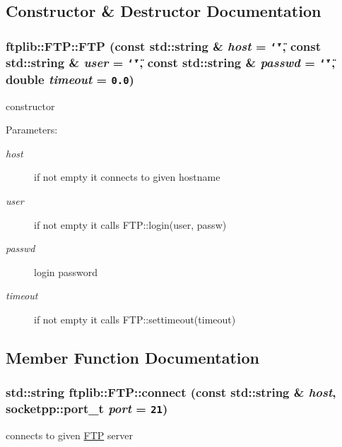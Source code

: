 \subsection{Constructor \& Destructor Documentation}
\hypertarget{classftplib_1_1FTP_178979abdc58593abdb31a882f370803}{
\subsubsection[{FTP}]{\setlength{\rightskip}{0pt plus 5cm}ftplib::FTP::FTP (const std::string \& {\em host} = {\tt \char`\"{}\char`\"{}}, \/  const std::string \& {\em user} = {\tt \char`\"{}\char`\"{}}, \/  const std::string \& {\em passwd} = {\tt \char`\"{}\char`\"{}}, \/  double {\em timeout} = {\tt 0.0})}}
\label{classftplib_1_1FTP_178979abdc58593abdb31a882f370803}


constructor 

\begin{Desc}
\item[Parameters:]
\begin{description}
\item[{\em host}]if not empty it connects to given hostname \item[{\em user}]if not empty it calls FTP::login(user, passw) \item[{\em passwd}]login password \item[{\em timeout}]if not empty it calls FTP::settimeout(timeout) \end{description}
\end{Desc}


\subsection{Member Function Documentation}
\hypertarget{classftplib_1_1FTP_fbd3444a33e5dd055474c9a0d6aabba5}{
\subsubsection[{connect}]{\setlength{\rightskip}{0pt plus 5cm}std::string ftplib::FTP::connect (const std::string \& {\em host}, \/  socketpp::port\_\-t {\em port} = {\tt 21})}}
\label{classftplib_1_1FTP_fbd3444a33e5dd055474c9a0d6aabba5}


connects to given \hyperlink{classftplib_1_1FTP}{FTP} server 

